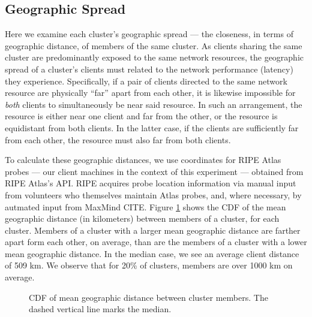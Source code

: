 \subsection{Geographic Spread}
\label{sect:geospread}

Here we examine each cluster's geographic spread --- the closeness, in terms of
geographic distance, of members of the same cluster. As clients sharing the same
cluster are predominantly exposed to the same network resources, the geographic
spread of a cluster's clients must related to the network performance (latency)
they experience. Specifically, if a pair of clients directed
to the same network resource are physically ``far'' apart from each other, it is
likewise impossible for \emph{both} clients to simultaneously be near said
resource. In such an arrangement, the resource is either near one client and far from the other, or the
resource is equidistant from both clients. In the latter case, if the clients
are sufficiently far from each other, the resource must also far from both clients.

To calculate these geographic distances, we use coordinates for RIPE Atlas
probes --- our client machines in the context of this experiment --- obtained
from RIPE Atlas's API. RIPE acquires probe location information via manual input
from volunteers who themselves maintain Atlas probes, and, where necessary, by
autmated input from MaxMind CITE. Figure \ref{geomeans} shows the CDF of the
mean geographic distance (in kilometers) between members of a cluster, for each
cluster. Members of a cluster with a larger mean geographic distance are farther
apart form each other, on average, than are the members of a cluster with a
lower mean geographic distance. In the median case, we see an average client
distance of 509 km. We observe that for 20\% of clusters, members are over 1000
km on average.  

\begin{figure}
    \caption{CDF of mean geographic distance between
    cluster members. The dashed vertical line marks the median.}
    \label{geomeans}
\end{figure}

